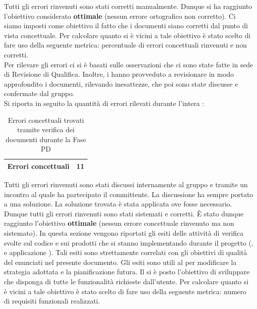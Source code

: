 				Tutti gli errori rinvenuti sono stati corretti manualmente. Dunque si ha raggiunto l'obiettivo considerato \textbf{ottimale} (nessun errore ortografico non corretto).
				Ci siamo imposti come obiettivo il fatto che i documenti siano corretti dal punto di vista concettuale. Per calcolare quanto si è vicini a tale obiettivo è stato scelto di fare uso della seguente metrica: percentuale di errori concettuali rinvenuti e non corretti.\\
				Per rilevare gli errori ci si è basati sulle osservazioni che ci sono state fatte in sede di Revisione di Qualifica. Inoltre, i  hanno provveduto a revisionare in modo approfondito i documenti, rilevando inesattezze, che poi sono state discusse e confermate dal gruppo.\\
				Si riporta in seguito la quantità di errori rilevati durante l'intera :
				\begin{table}[H]
					\centering
						\begin{tabu}{| l | c |} \hline
							Errori concettuali & 11\\ \hline
						\end{tabu}
					\caption{Errori concettuali trovati tramite verifica dei documenti durante la Fase PD}
				\end{table}
				Tutti gli errori rinvenuti sono stati discussi internamente al gruppo e tramite un incontro al quale ha partecipato il committente. La discussione ha sempre portato a una soluzione. La soluzione trovata è stata applicata ove fosse necessario. Dunque tutti gli errori rinvenuti sono stati sistemati e corretti. È stato dunque raggiunto l'obiettivo \textbf{ottimale} (nessun errore concettuale rinvenuto ma non sistemato).
			In questa sezione vengono riportati gli esiti delle attività di verifica svolte sul codice e sui prodotti  che si stanno implementando durante il progetto (,  e applicazione ). Tali esiti sono strettamente correlati con gli obiettivi di qualità del  enunciati nel presente documento. Gli esiti sono utili al  per modificare la strategia adottata e la pianificazione futura.
				Il \groupname si è posto l'obiettivo di sviluppare  che disponga di tutte le funzionalità richieste dall'utente. Per calcolare quanto si è vicini a tale obiettivo è stato scelto di fare uso della seguente metrica: numero di requisiti funzionali realizzati.\\
